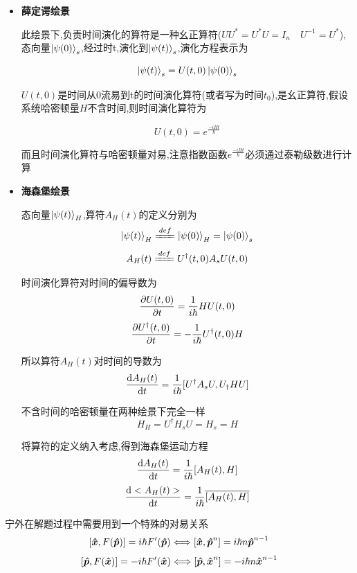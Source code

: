 \documentclass{article}
\begin{document}
            \begin{formal}

                \begin{itemize}
                    \item 
                    \textbf{薛定谔绘景} 

                    此绘景下,负责时间演化的算符是一种幺正算符($ UU^{*} = U^{*}U = I_{n} \quad U^{-1} = U^{*} $),态向量$\ket{\psi(0)}_{s}$,经过时t,演化到$\ket{\psi(t)}_{s}$,演化方程表示为
    
                    $$ \ket{\psi(t)}_{s} = U(t,0) \ket{\psi(0)}_{s} $$
    
                    $U(t,0)$是时间从0流易到t的时间演化算符(或者写为时间$t_{0}$),是幺正算符,假设系统哈密顿量$H$不含时间,则时间演化算符为
    
                    $$ U(t,0) = e^{\frac{-iHt}{\hbar}} $$
    
                    而且时间演化算符与哈密顿量对易,注意指数函数$e^{\frac{-iHt}{\hbar}}$必须通过泰勒级数进行计算

                    \item   
                    \textbf{海森堡绘景} 

                    态向量$\ket{\psi(t)}_{H}$,算符$A_{H}(t)$的定义分别为
                    $$ \ket{\psi(t)}_{H} \xlongequal{def} \ket{\psi(0)}_{H} = \ket{\psi(0)}_{s}$$
                    $$ A_{H}(t) \xlongequal{def} U^{\dagger}(t,0)A_{s}U(t,0) $$

                    时间演化算符对时间的偏导数为
                    $$ \pdv{U(t,0)}{t} = \frac{1}{i\hbar} H U(t,0) $$
                    $$ \pdv{U^{\dagger}(t,0)}{t} = - \frac{1}{i\hbar} U^{\dagger}(t,0) H$$

                    所以算符$A_{H}(t)$对时间的导数为
                    $$ \dv{A_{H}(t)}{t} = \frac{1}{i \hbar} [U^{\dagger} A_{s} U,U_{\dagger} H U]$$

                    不含时间的哈密顿量在两种绘景下完全一样
                    $$ H_{H} = U^{\dagger} H_{s} U = H_{s} =H $$

                    将算符的定义纳入考虑,得到海森堡运动方程
                    $$ \dv{A_{H}(t)}{t} = \frac{1}{i\hbar} [A_{H}(t),H] $$
                    $$ \dv{<A_{H}(t)>}{t} = \frac{1}{i\hbar} \overline{[A_{H}(t),H]} $$
                \end{itemize}

                宁外在解题过程中需要用到一个特殊的对易关系
                $$ [\vu*{x} , F(\vu*{p})] = i\hbar F'(\vu*{p}) \Longleftrightarrow [\vu*{x} , \vu*{p}^{n}] = i\hbar n \vu*{p}^{n-1} $$
                $$ [\vu*{p} , F(\vu*{x})] = -i\hbar F'(\vu*{x}) \Longleftrightarrow [\vu*{p} , \vu*{x}^{n}] = -i\hbar n \vu*{x}^{n-1} $$
                


                
            \end{formal}
            
\end{document}

